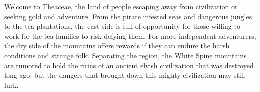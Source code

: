 Welcome to Theaceae, the land of people escaping away from civilization or seeking gold and adventure.
From the pirate infested seas and dangerous jungles to the tea plantations, the east side is full of opportunity for those willing to work for the tea families to risk defying them.
For more independent adventurers, the dry side of the mountains offers rewards if they can endure the harsh conditions and strange folk.
Separating the region, the White Spine mountains are rumored to hold the ruins of an ancient elvish civilization that was destroyed long ago, but the dangers that brought down this mighty civilization may still lurk.

